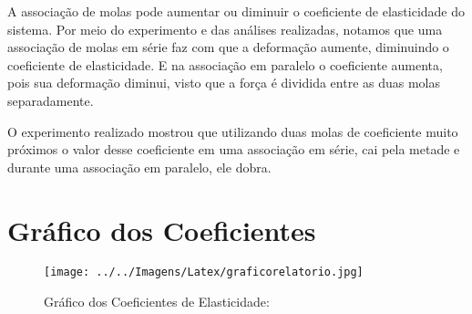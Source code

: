 \documentclass[
	12pt,				%
	oneside,			%
	a4paper,			%
	english,			%
	french,				%
	spanish,			%
	brazil,				%
	]{abntex2}
\begin{document}
A associação de molas pode aumentar ou diminuir o coeficiente de elasticidade do sistema. Por meio do experimento e das análises realizadas, notamos que uma associação de molas em série faz com que a deformação aumente, diminuindo o coeficiente de elasticidade. E na associação em paralelo o coeficiente aumenta, pois sua deformação diminui, visto que a força é dividida entre as duas molas separadamente.

O experimento realizado mostrou que utilizando duas molas de coeficiente muito próximos o valor desse coeficiente em uma associação em série, cai pela metade e durante uma associação em paralelo, ele dobra.


\apendices 
\chapter{Gráfico dos Coeficientes}

\begin{figure}[H]
\begin{center}

\caption{Gráfico dos Coeficientes de Elasticidade:}
\texttt{[image: ../../Imagens/Latex/graficorelatorio.jpg]} 

\end{center}
\end{figure}





%
%
\end{document}
